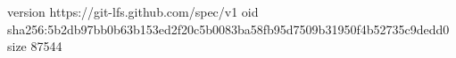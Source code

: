 version https://git-lfs.github.com/spec/v1
oid sha256:5b2db97bb0b63b153ed2f20c5b0083ba58fb95d7509b31950f4b52735c9dedd0
size 87544
